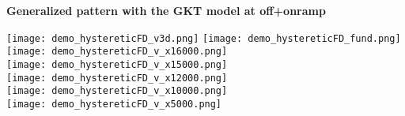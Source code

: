\documentclass[a4paper,12pt]{scrartcl}
\begin{document}
\begin{center}

{\Large\sf\textbf{Generalized pattern with the GKT model at off+onramp}}


\hspace*{-40mm}
\texttt{[image: demo\_hystereticFD\_v3d.png]}
\hspace*{-5mm}
\texttt{[image: demo\_hystereticFD\_fund.png]}
\texttt{[image: demo\_hystereticFD\_v\_x16000.png]} \\[-2mm]
\texttt{[image: demo\_hystereticFD\_v\_x15000.png]} \\[-2mm]
\texttt{[image: demo\_hystereticFD\_v\_x12000.png]} \\[-2mm]
\texttt{[image: demo\_hystereticFD\_v\_x10000.png]} \\[-2mm]
\texttt{[image: demo\_hystereticFD\_v\_x5000.png]}
\end{center}





\end{document}
